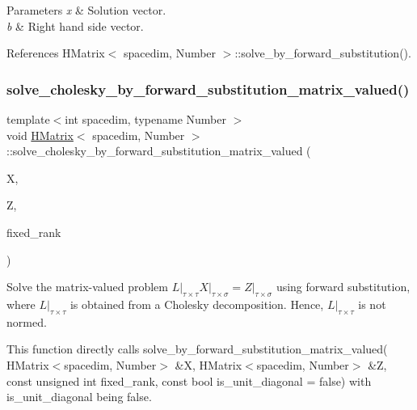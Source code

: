 \begin{DoxyParams}{Parameters}
{\em x} & Solution vector. \\
\hline
{\em b} & Right hand side vector. \\
\hline
\end{DoxyParams}


References H\+Matrix$<$ spacedim, Number $>$\+::solve\+\_\+by\+\_\+forward\+\_\+substitution().

\mbox{\label{classHMatrix_a948b0b53490cc7614ee82fec80fa245a}} 
\subsubsection{\texorpdfstring{solve\+\_\+cholesky\+\_\+by\+\_\+forward\+\_\+substitution\+\_\+matrix\+\_\+valued()}{solve\_cholesky\_by\_forward\_substitution\_matrix\_valued()}}
{\footnotesize\ttfamily template$<$int spacedim, typename Number $>$ \\
void \hyperlink{classHMatrix}{H\+Matrix}$<$ spacedim, Number $>$\+::solve\+\_\+cholesky\+\_\+by\+\_\+forward\+\_\+substitution\+\_\+matrix\+\_\+valued (\begin{DoxyParamCaption}\item[{\hyperlink{classHMatrix}{H\+Matrix}$<$ spacedim, Number $>$ \&}]{X,  }\item[{\hyperlink{classHMatrix}{H\+Matrix}$<$ spacedim, Number $>$ \&}]{Z,  }\item[{const unsigned int}]{fixed\+\_\+rank }\end{DoxyParamCaption})}

Solve the matrix-\/valued problem $L\vert_{\tau\times\tau}X\vert_{\tau\times\sigma}=Z\vert_{\tau\times\sigma}$ using forward substitution, where $L\vert_{\tau\times\tau}$ is obtained from a Cholesky decomposition. Hence, $L\vert_{\tau\times\tau}$ is not normed.

This function directly calls {\ttfamily solve\+\_\+by\+\_\+forward\+\_\+substitution\+\_\+matrix\+\_\+valued}( H\+Matrix$<$spacedim, Number$>$ \&X, H\+Matrix$<$spacedim, Number$>$ \&Z, const unsigned int fixed\+\_\+rank, const bool is\+\_\+unit\+\_\+diagonal = false) with {\ttfamily is\+\_\+unit\+\_\+diagonal} being {\ttfamily false}.


